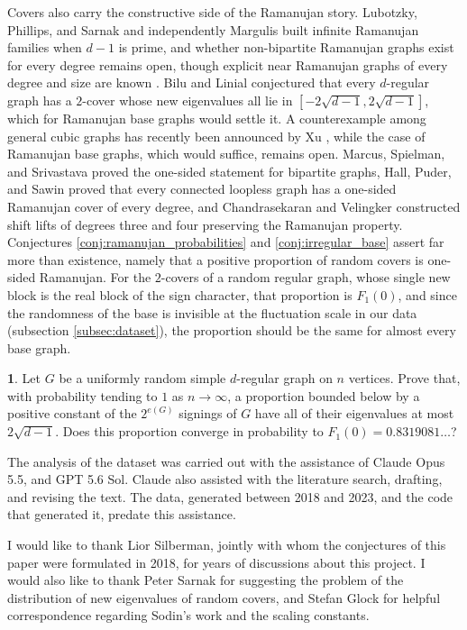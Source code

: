 \documentclass[12pt,oneside,english]{amsart}
\numberwithin{equation}{section}
\numberwithin{figure}{section}
\numberwithin{table}{section}
\theoremstyle{plain}
\numberwithin{thm}{section}
\theoremstyle{plain}
\theoremstyle{plain}
\theoremstyle{plain}
\theoremstyle{definition}
\theoremstyle{definition}
\theoremstyle{definition}
\newtheorem{problem}[thm]{\protect\problemname}
\theoremstyle{remark}
\providecommand{\problemname}{Problem}
\begin{document}
Covers also carry the constructive side of the Ramanujan story. Lubotzky,
Phillips, and Sarnak \cite{LubotzkyPhillipsSarnak1988} and independently
Margulis \cite{Margulis1988} built infinite Ramanujan families when
$d-1$ is prime, and whether non-bipartite Ramanujan graphs exist
for every degree remains open, though explicit near Ramanujan graphs
of every degree and size are known \cite{Alon2021}. Bilu and Linial
\cite{BiluLinial2006} conjectured that every $d$-regular graph has
a $2$-cover whose new eigenvalues all lie in $[-2\sqrt{d-1},2\sqrt{d-1}]$,
which for Ramanujan base graphs would settle it. A counterexample
among general cubic graphs has recently been announced by Xu \cite{Xu2026},
while the case of Ramanujan base graphs, which would suffice, remains
open.
Marcus, Spielman, and Srivastava \cite{MarcusSpielmanSrivastava2015}
proved the one-sided statement for bipartite graphs, Hall, Puder,
and Sawin \cite{HallPuderSawin2018} proved that every connected loopless
graph has a one-sided Ramanujan cover of every degree, and Chandrasekaran
and Velingker \cite{ChandrasekaranVelingker2017} constructed shift
lifts of degrees three and four preserving the Ramanujan property.
Conjectures \ref{conj:ramanujan_probabilities} and \ref{conj:irregular_base}
assert far more than existence, namely that a positive proportion
of random covers is one-sided Ramanujan. For the $2$-covers of a
random regular graph, whose single new block is the real block of
the sign character, that proportion is $F_{1}(0)$, and since the randomness
of the base is invisible at the fluctuation scale in our data (subsection
\ref{subsec:dataset}), the proportion should be the same for almost
every base graph.
\begin{problem}
\label{prob:two_covers}Let $G$ be a uniformly random simple $d$-regular
graph on $n$ vertices. Prove that, with probability tending to $1$
as $n\rightarrow\infty$, a proportion bounded below by a positive
constant of the $2^{e(G)}$ signings of $G$ have all of their eigenvalues
at most $2\sqrt{d-1}$. Does this proportion converge in probability
to $F_{1}(0)=0.8319081\dots$?
\end{problem}


The analysis of the dataset was carried out with the assistance of
Claude Opus 5.5, and GPT 5.6 Sol. Claude also assisted with the literature
search, drafting, and revising the text. The data, generated between
2018 and 2023, and the code that generated it, predate this assistance.


I would like to thank Lior Silberman, jointly with whom the conjectures
of this paper were formulated in 2018, for years of discussions about
this project. I would also like to thank Peter Sarnak for suggesting
the problem of the distribution of new eigenvalues of random covers,
and Stefan Glock for helpful correspondence regarding Sodin's work
and the scaling constants.



\end{document}
